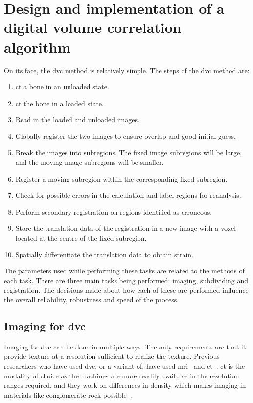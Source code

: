 \section[Digital volume correlation design]{Design and implementation of a digital volume correlation algorithm}
\label{sec:dvc_implement}
On its face, the \ac{dvc} method is relatively simple.
The steps of the \ac{dvc} method are:
\begin{enumerate}
\label{lst:dvcMethod}
\item \label{dvc:imageUnloaded} \ac{ct} a bone in an unloaded state.
\item \label{dvc:imageLoaded} \ac{ct} the bone in a loaded state.
\item \label{dvc:readImages} Read in the loaded and unloaded images.
\item \label{dvc:globalReg} Globally register the two images to ensure overlap and good initial guess.
\item \label{dvc:subregion} Break the images into subregions. The fixed image subregions will be large, and the moving image subregions will be smaller.
\item \label{dvc:register} Register a moving subregion within the corresponding fixed subregion.
\item \label{dvc:errorDetect} Check for possible errors in the calculation and label regions for reanalysis.
\item \label{dvc:reRegister} Perform secondary registration on regions identified as erroneous.
\item \label{dvc:store} Store the translation data of the registration in a new image with a voxel located at the centre of the fixed subregion.
\item \label{dvc:differentiate} Spatially differentiate the translation data to obtain strain.
\end{enumerate}

The parameters used while performing these tasks are related to the methods of each task.
There are three main tasks being performed: imaging, subdividing and registration.
The decisions made about how each of these are performed influence the overall reliability, robustness and speed of the process.

\subsection{Imaging for \acs*{dvc}}
\label{sec:dvc_implement_imaging}
Imaging for \ac{dvc} can be done in multiple ways.
The only requirements are that it provide texture at a resolution sufficient to realize the texture.
Previous researchers who have used \ac{dvc}, or a variant of, have used \ac{mri}~\citep{benoit_3d_2009} and \ac{ct}~\citep{bay_texture_1995, bay_digital_1999, bay_measurement_1999, bay_methods_2008, hardisty_whole_2009, hardisty_image_2010, lenoir_volumetric_2007, roux_three-dimensional_2008, smith_digital_2002}.
\acs{ct} is the modality of choice as the machines are more readily available in the resolution ranges required, and they work on differences in density which makes imaging in materials like conglomerate rock possible~\citep{lenoir_volumetric_2007, bornert_discrete_2010}.

